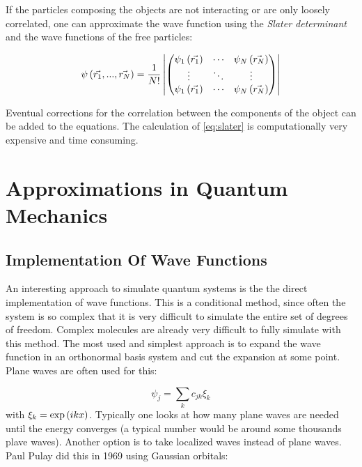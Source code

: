 If the particles composing the objects are not interacting or are only loosely correlated, one can approximate the wave function using the \emph{Slater determinant} and the wave functions of the free particles:

\begin{equation}
\psi\left(\vec{r_1},...,\vec{r_N}\right)
=
\frac{1}{N!}
\left|
\begin{pmatrix}
 \psi_1\left(\vec{r_1}\right) & \cdots & \psi_N\left(\vec{r_N}\right)\\
 \vdots				  & \ddots & \vdots	\\
 \psi_1\left(\vec{r_1}\right) & \cdots & \psi_N\left(\vec{r_N}\right)\\
\end{pmatrix}
\right|
\label{eq:slater}
\end{equation}


Eventual corrections for the correlation between the components of the object can be added to the equations. The calculation of \eqref{eq:slater} is computationally very expensive and time consuming.









\section{Approximations in Quantum Mechanics}


\subsection{Implementation Of Wave Functions}

An interesting approach to simulate quantum systems is the the direct implementation of wave functions. This is a conditional method, since often the system is so complex that it is very difficult to simulate the entire set of degrees of freedom. Complex molecules are already very difficult to fully simulate with this method. The most used and simplest approach is to expand the wave function in an orthonormal basis system and cut the expansion at some point. Plane waves are often used for this:



\begin{equation}
\psi_j = \sum_k c_{jk} \xi_k
\end{equation}
with $\xi_k = \exp\left(ikx\right)$. Typically one looks at how many plane waves are needed until the energy converges (a typical number would be around some thousands plave waves). Another option is to take localized waves instead of plane waves. Paul Pulay did this in 1969 using Gaussian orbitals:

